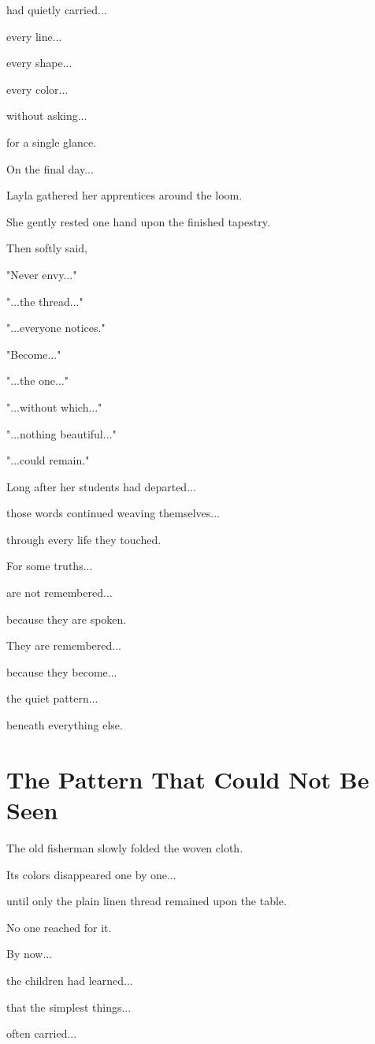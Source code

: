 \documentclass[12pt,openany]{book}
\begin{document}
had quietly carried...

every line...

every shape...

every color...

without asking...

for a single glance.

On the final day...

Layla gathered her apprentices around the loom.

She gently rested one hand upon the finished tapestry.

Then softly said,

"Never envy..."

"...the thread..."

"...everyone notices."

"Become..."

"...the one..."

"...without which..."

"...nothing beautiful..."

"...could remain."

Long after her students had departed...

those words continued weaving themselves...

through every life they touched.

For some truths...

are not remembered...

because they are spoken.

They are remembered...

because they become...

the quiet pattern...

beneath everything else.
\section*{The Pattern That Could Not Be Seen}

The old fisherman slowly folded the woven cloth.

Its colors disappeared one by one...

until only the plain linen thread remained upon the table.

No one reached for it.

By now...

the children had learned...

that the simplest things...

often carried...
\end{document}
